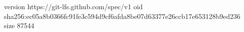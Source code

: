 version https://git-lfs.github.com/spec/v1
oid sha256:ec05a8b0366fc91fe3c594d9cf6afda8be07d63377e26ccb17e653128b9ed236
size 87544

